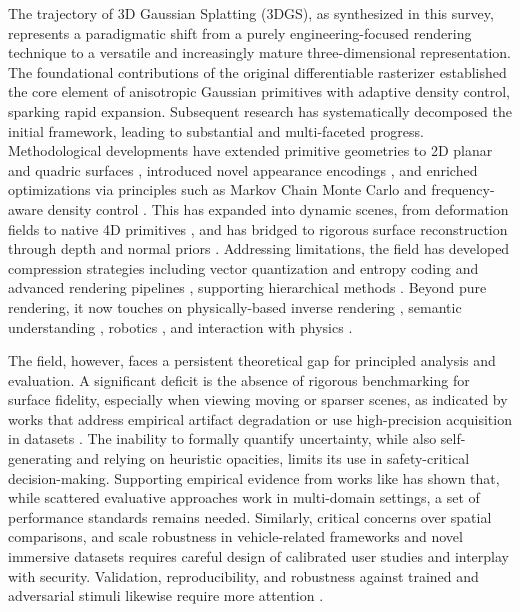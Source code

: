 \documentclass[11pt,a4paper]{article}
\begin{document}
The trajectory of 3D Gaussian Splatting (3DGS), as synthesized in this survey, represents a paradigmatic shift from a purely engineering-focused rendering technique to a versatile and increasingly mature three-dimensional representation. The foundational contributions of the original differentiable rasterizer \cite{arxiv:2308.04079v1} established the core element of anisotropic Gaussian primitives with adaptive density control, sparking rapid expansion. Subsequent research has systematically decomposed the initial framework, leading to substantial and multi-faceted progress. Methodological developments have extended primitive geometries to 2D planar and quadric surfaces \cite{arxiv:2403.17888v1,arxiv:2411.16392v4}, introduced novel appearance encodings \cite{arxiv:2512.14180v2}, and enriched optimizations via principles such as Markov Chain Monte Carlo \cite{arxiv:2404.09591v3} and frequency-aware density control \cite{arxiv:2411.12788v2}. This has expanded into dynamic scenes, from deformation fields \cite{arxiv:2310.08528v2} to native 4D primitives \cite{arxiv:2412.20720v2}, and has bridged to rigorous surface reconstruction through depth and normal priors \cite{arxiv:2403.17822v1}. Addressing limitations, the field has developed compression strategies including vector quantization and entropy coding \cite{arxiv:2311.18159v3,arxiv:2410.13613v3} and advanced rendering pipelines \cite{arxiv:2412.00578v3}, supporting hierarchical methods \cite{arxiv:2406.12080v1}. Beyond pure rendering, it now touches on physically-based inverse rendering \cite{arxiv:2410.24204v3}, semantic understanding \cite{arxiv:2410.01647v2}, robotics \cite{arxiv:2409.18122v3}, and interaction with physics \cite{arxiv:2401.15318v1}.

The field, however, faces a persistent theoretical gap for principled analysis and evaluation. A significant deficit is the absence of rigorous benchmarking for surface fidelity, especially when viewing moving or sparser scenes, as indicated by works that address empirical artifact degradation or use high-precision acquisition in datasets \cite{arxiv:2604.21400v4}. The inability to formally quantify uncertainty, while also self-generating and relying on heuristic opacities, limits its use in safety-critical decision-making. Supporting empirical evidence from works like \cite{arxiv:2511.06830v3} has shown that, while scattered evaluative approaches work in multi-domain settings, a set of performance standards remains needed. Similarly, critical concerns over spatial comparisons, and scale robustness in vehicle-related frameworks \cite{arxiv:2410.05111v3,arxiv:2411.16816v3} and novel immersive datasets \cite{arxiv:2308.04079v1} requires careful design of calibrated user studies and interplay with security. Validation, reproducibility, and robustness against trained and adversarial stimuli likewise require more attention \cite{arxiv:2604.21400v4}.
\end{document}
